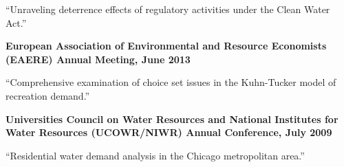 \documentclass[10pt,margin,line]{res}
\newenvironment{list1}{
  \begin{list}{\ding{113}}{%
      \setlength{\itemsep}{0in}
      \setlength{\parsep}{0in} \setlength{\parskip}{0in}
      \setlength{\topsep}{0in} \setlength{\partopsep}{0in}
      \setlength{\leftmargin}{0.17in}}}{\end{list}}
\newenvironment{list2}{
  \begin{list}{-}{%
      \setlength{\itemsep}{0in}
      \setlength{\parsep}{0in} \setlength{\parskip}{0in}
      \setlength{\topsep}{0in} \setlength{\partopsep}{0in}
      \setlength{\leftmargin}{0.2in}}}{\end{list}}
\begin{document}
\begin{resume}
\begin{list1}
\begin{list2}
  \item ``Unraveling deterrence effects of regulatory activities under the Clean Water Act.''
  \end{list2}
\vspace*{0.3cm}
\item[] \textbf{European Association of Environmental and Resource Economists (EAERE) Annual Meeting, June 2013}
  \begin{list2}
  \item ``Comprehensive examination of choice set issues in the Kuhn-Tucker model of recreation demand.''
  \end{list2}
\vspace*{0.3cm}
\item[] \textbf{Universities Council on Water Resources and National Institutes for Water Resources (UCOWR/NIWR) Annual Conference, July 2009}
  \begin{list2}
  \item ``Residential water demand analysis in the Chicago metropolitan area.''
  \end{list2}
\end{list1}




\end{resume}
\end{document}
